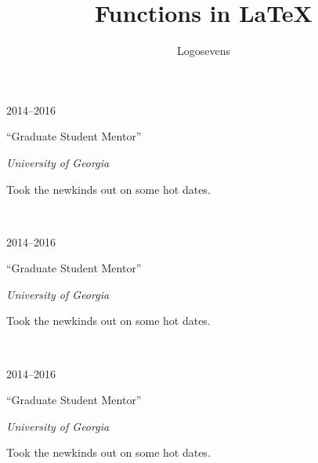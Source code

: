 \documentclass{article}
\title{Functions in {\LaTeX}}
\author{Logosevens}
\newcommand{\uga}{University of Georgia}
\newcommand{\entry}[4]{
  \begin{minipage}[t]{.15\textwidth}
    \hfill \textsc{#1}
  \end{minipage}
  \hfill\vline\hfill
  \begin{minipage}[t]{.80\textwidth}
    #2

    \textit{#3}

    \footnotesize{#4}
  \end{minipage}\\\vspace{.25cm}
}
\begin{document}
\maketitle

\entry{2014--2016}{``Graduate Student Mentor''}{\uga}{Took the newkinds out on some hot dates.}

\entry{2014--2016}{``Graduate Student Mentor''}{\uga}{Took the newkinds out on some hot dates.}

\entry{2014--2016}{``Graduate Student Mentor''}{\uga}{Took the newkinds out on some hot dates.}
   
\end{document}
